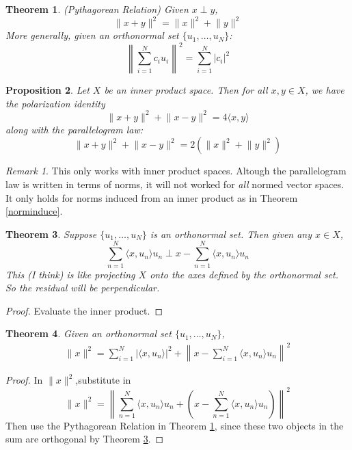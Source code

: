 \documentclass[12pt]{article}
\theoremstyle{plain}
\newtheorem{thm}{Theorem}[subsection]
\newtheorem{prop}[thm]{Proposition}
\theoremstyle{definition}
\theoremstyle{remark}
\newtheorem*{rmk}{Remark}
\begin{document}
\begin{thm}
\label{pythag}
\emph{(Pythagorean Relation)} Given $x\perp y$, 
\[
    \lVert x + y\rVert^2 = \lVert x\rVert^2 + \lVert y \rVert^2
\]
More generally, given an orthonormal set $\{u_1,\ldots,u_N\}$:
\[
    \left\lVert \sum_{i=1}^N c_i u_i \right\rVert^2 
    = \sum_{i=1}^N |c_i|^2
\]
\end{thm}

\begin{prop}
Let $X$ be an inner product space. Then for all $x,y\in X$, we have the \emph{polarization identity}
\[
    \lVert x+y\rVert^2 + \lVert x-y\rVert^2
    = 4\langle x,y\rangle
\]
along with the \emph{parallelogram law}:
\[
    \lVert x+y\rVert^2 + \lVert x-y\rVert^2
    =2\left(\lVert x\rVert^2 +\lVert y\rVert^2\right)
\]
\end{prop}
\begin{rmk}
    This only works with inner product spaces. Altough the parallelogram law is written in terms of norms, it will not worked for \emph{all} normed vector spaces. It only holds for norms induced from an inner product as in Theorem
\ref{norminduce}.
\end{rmk}

\begin{thm}
\label{projorth}
Suppose $\{u_1,\ldots,u_N\}$ is an orthonormal set. Then given any $x\in X$, 
\[
    \sum_{n=1}^N \langle x,u_n\rangle u_n
    \perp
    x -\sum_{n=1}^N \langle x,u_n\rangle u_n
\]
This (I think) is like projecting $X$ onto the axes defined by the orthonormal set. So the residual will be perpendicular.
\end{thm}
\begin{proof}
Evaluate the inner product.
\end{proof}

\begin{thm}
Given an orthonormal set $\{u_1,\ldots,u_N\}$, 
\begin{align*}
    \lVert x\rVert^2 = 
    \sum_{i=1}^N \bigl\lvert\langle x,u_n\rangle\bigr\rvert^2 
    + \left\lVert x -  \sum_{i=1}^N\langle x,u_n\rangle u_n \right\rVert^2
\end{align*}
\end{thm}
\begin{proof}
In $\lVert x\rVert^2$,substitute in 
\[
    \lVert x\rVert^2 = 
    \left\lVert
    \sum_{n=1}^N \langle x,u_n\rangle u_n
    + \left( x 
    -\sum_{n=1}^N \langle x,u_n\rangle u_n\right)
    \right\rVert^2 
\]
Then use the Pythagorean Relation in Theorem \ref{pythag}, since these two objects in the sum are orthogonal by Theorem \ref{projorth}.
\end{proof}
\end{document}

